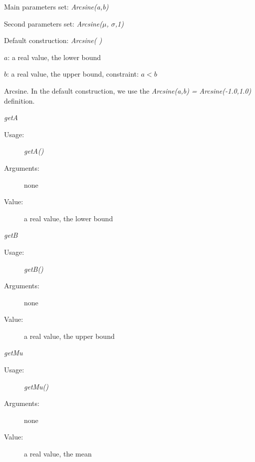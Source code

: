 \begin{description}

\item[Usage:] \rule{0pt}{1em}
\begin{description}
\item Main parameters set: \textit{Arcsine(a,b)}
\item Second parameters set: \textit{Arcsine($\mu$, $\sigma$,1)}
\item Default construction: \textit{Arcsine( )}
\end{description}

\item[Arguments:]  \rule{0pt}{1em}
\begin{description}
\item $a$: a real value, the lower bound
\item $b$: a real value, the upper bound, constraint: $a<b$
\end{description}

\item[Value:]  Arcsine. In the default construction, we use the \textit{Arcsine(a,b) = Arcsine(-1.0,1.0)} definition.

\item[Some methods:] \rule{0pt}{1em}
\begin{description}

\item \textit{getA}
\begin{description}
\item[Usage:] \textit{getA()}
\item[Arguments:] none
\item[Value:]  a real value, the lower bound
\end{description}
\bigskip

\item \textit{getB}
\begin{description}
\item[Usage:] \textit{getB()}
\item[Arguments:] none
\item[Value:]  a real value, the upper bound
\end{description}

\item \textit{getMu}
\begin{description}
\item[Usage:] \textit{getMu()}
\item[Arguments:] none
\item[Value:]  a real value, the mean
\end{description}
\bigskip


\end{description}
\end{description}
